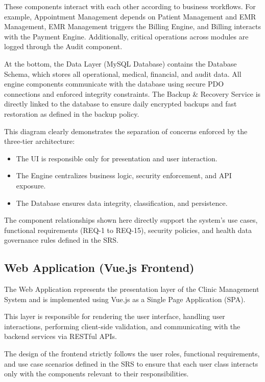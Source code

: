 These components interact with each other according to business workflows. For example, Appointment Management depends on Patient Management and EMR Management, EMR Management triggers the Billing Engine, and Billing interacts with the Payment Engine. Additionally, critical operations across modules are logged through the Audit component.

At the bottom, the Data Layer (MySQL Database) contains the Database Schema, which stores all operational, medical, financial, and audit data. All engine components communicate with the database using secure PDO connections and enforced integrity constraints. The Backup \& Recovery Service is directly linked to the database to ensure daily encrypted backups and fast restoration as defined in the backup policy.

This diagram clearly demonstrates the separation of concerns enforced by the three-tier architecture:
\begin{itemize}
	\item The UI is responsible only for presentation and user interaction.
	\item The Engine centralizes business logic, security enforcement, and API exposure.
	\item The Database ensures data integrity, classification, and persistence.
\end{itemize}

The component relationships shown here directly support the system's use cases, functional requirements (REQ-1 to REQ-15), security policies, and health data governance rules defined in the SRS.
\subsection{Web Application (Vue.js Frontend)}
The Web Application represents the presentation layer of the Clinic Management System and is implemented using Vue.js as a Single Page Application (SPA).

This layer is responsible for rendering the user interface, handling user interactions, performing client-side validation, and communicating with the backend services via RESTful APIs.

The design of the frontend strictly follows the user roles, functional requirements, and use case scenarios defined in the SRS to ensure that each user class interacts only with the components relevant to their responsibilities.

